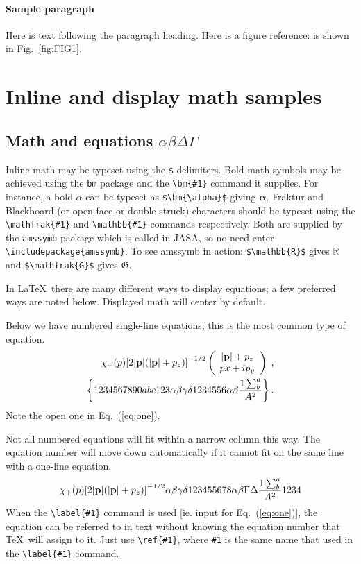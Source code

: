 \documentclass[reprint]{JASA}
\begin{document}
\paragraph{Sample paragraph}Here is text following the paragraph
heading.
Here is a figure reference: is shown in Fig.~\ref{fig:FIG1}.


\section{Inline and display math samples\label{sec:3}}

\subsection{\label{subsec:3:3} Math and equations $\alpha\beta\Delta\Gamma$}
Inline math may be typeset using the \verb+$+ delimiters. Bold math
symbols may be achieved using the \verb+bm+ package and the
\verb+\bm{#1}+ command it supplies. For instance, a bold $\alpha$ can
be typeset as \verb+$\bm{\alpha}$+ giving $\bm{\alpha}$. Fraktur and
Blackboard (or open face or double struck) characters should be
typeset using the \verb+\mathfrak{#1}+ and \verb+\mathbb{#1}+ commands
respectively. Both are supplied by the \texttt{amssymb} package which
is called in JASA, so no need enter \verb+\includepackage{amssymb}+.
To see amssymb in action:
\verb+$\mathbb{R}$+ gives $\mathbb{R}$ and
\verb+$\mathfrak{G}$+ gives $\mathfrak{G}$.

In \LaTeX\ there are many different ways to display equations; a
few preferred ways are noted below. Displayed math will center by
default. 

Below we have numbered single-line equations; this is the most common
type of equation.
\begin{eqnarray}
\chi_+(p){\bf [}2|{\bf p}|(|{\bf p}|+p_z){\bf ]}^{-1/2}
\left(
\begin{array}{c}
|{\bf p}|+p_z\\
px+ip_y
\end{array}\right)\;,
\\
\left\{%
 1234567890abc123\alpha\beta\gamma\delta1234556\alpha\beta
 \frac{1\sum^{a}_{b}}{A^2}%
\right\}%
\label{eq:one}.
\end{eqnarray}
Note the open one in Eq.~(\ref{eq:one}).

Not all numbered equations will fit within a narrow column this
way. The equation number will move down automatically if it cannot fit
on the same line with a one-line equation.
\begin{equation}
\chi_+(p){\bf [}2|{\bf p}|(|{\bf p}|+p_z){\bf ]}^{-1/2}
\alpha\beta\gamma\delta123455678\alpha\beta\Gamma\Delta
 \frac{1\sum^{a}_{b}}{A^2}1234%
\end{equation}
When the \verb+\label{#1}+ command is used [ie. input for
Eq.~(\ref{eq:one})], the equation can be referred to in text without
knowing the equation number that \TeX\ will assign to it. Just
use \verb+\ref{#1}+, where \verb+#1+ is the same name that used in
the \verb+\label{#1}+ command.
\end{document}
